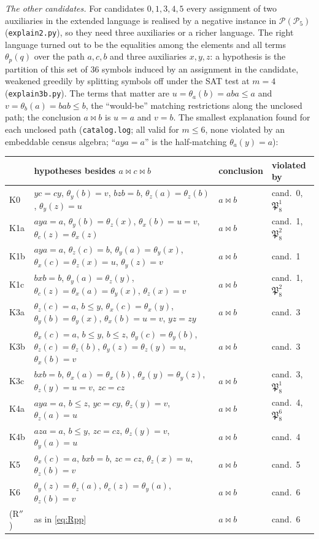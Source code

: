 \documentclass[11pt]{amsart}
\theoremstyle{definition}
\renewcommand{\P}{\mathcal{P}}
\begin{document}
\smallskip
\emph{The other candidates.} For candidates $0,1,3,4,5$ every assignment of two auxiliaries in the extended language is realised by a negative instance in $\P(\P_5)$ (\texttt{explain2.py}), so they need three auxiliaries or a richer language. The right language turned out to be the equalities among the elements and all terms $\theta_p(q)$ over the path $a,c,b$ and three auxiliaries $x,y,z$: a hypothesis is the partition of this set of $36$ symbols induced by an assignment in the candidate, weakened greedily by splitting symbols off under the SAT test at $m=4$ (\texttt{explain3b.py}). The terms that matter are $u=\theta_a(b)=aba\le a$ and $v=\theta_b(a)=bab\le b$, the ``would-be'' matching restrictions along the unclosed path; the conclusion $a\bowtie b$ is $u=a$ and $v=b$. The smallest explanation found for each unclosed path (\texttt{catalog.log}; all valid for $m\le6$, none violated by an embeddable census algebra; ``$aya=a$'' is the half-matching $\theta_a(y)=a$):
\begin{center}\small
\begin{tabular}{@{}llll@{}}
\toprule
& hypotheses besides $a\bowtie c\bowtie b$ & conclusion & violated by\\
\midrule
K0 & $yc=cy$, $\theta_y(b)=v$, $bzb=b$, $\theta_z(a)=\theta_z(b)$, $\theta_y(z)=u$ & $a\bowtie b$ & cand.\ 0, $\mathfrak P_8^1$\\
K1a & $aya=a$, $\theta_y(b)=\theta_z(x)$, $\theta_x(b)=u=v$, $\theta_c(z)=\theta_x(z)$ & $a\bowtie b$ & cand.\ 1, $\mathfrak P_8^2$\\
K1b & $aya=a$, $\theta_z(c)=b$, $\theta_y(a)=\theta_y(x)$, $\theta_x(c)=\theta_z(x)=u$, $\theta_y(z)=v$ & $a\bowtie b$ & cand.\ 1\\
K1c & $bxb=b$, $\theta_y(a)=\theta_z(y)$, $\theta_c(z)=\theta_x(a)=\theta_y(x)$, $\theta_z(x)=v$ & $a\bowtie b$ & cand.\ 1, $\mathfrak P_8^2$\\
K3a & $\theta_z(c)=a$, $b\le y$, $\theta_x(c)=\theta_x(y)$, $\theta_y(b)=\theta_y(x)$, $\theta_x(b)=u=v$, $yz=zy$ & $a\bowtie b$ & cand.\ 3\\
K3b & $\theta_x(c)=a$, $b\le y$, $b\le z$, $\theta_y(c)=\theta_y(b)$, $\theta_z(c)=\theta_z(b)$, $\theta_y(z)=\theta_z(y)=u$, $\theta_x(b)=v$ & $a\bowtie b$ & cand.\ 3\\
K3c & $bxb=b$, $\theta_x(a)=\theta_x(b)$, $\theta_x(y)=\theta_y(z)$, $\theta_z(y)=u=v$, $zc=cz$ & $a\bowtie b$ & cand.\ 3, $\mathfrak P_8^1$\\
K4a & $aya=a$, $b\le z$, $yc=cy$, $\theta_z(y)=v$, $\theta_z(a)=u$ & $a\bowtie b$ & cand.\ 4, $\mathfrak P_8^6$\\
K4b & $aza=a$, $b\le y$, $zc=cz$, $\theta_z(y)=v$, $\theta_y(a)=u$ & $a\bowtie b$ & cand.\ 4\\
K5 & $\theta_x(c)=a$, $bxb=b$, $zc=cz$, $\theta_z(x)=u$, $\theta_z(b)=v$ & $a\bowtie b$ & cand.\ 5\\
K6 & $\theta_y(z)=\theta_z(a)$, $\theta_c(z)=\theta_y(a)$, $\theta_z(b)=v$ & $a\bowtie b$ & cand.\ 6\\
(R$''$) & as in \eqref{eq:Rpp} & $a\bowtie b$ & cand.\ 6\\
\bottomrule
\end{tabular}
\end{center}
\end{document}

